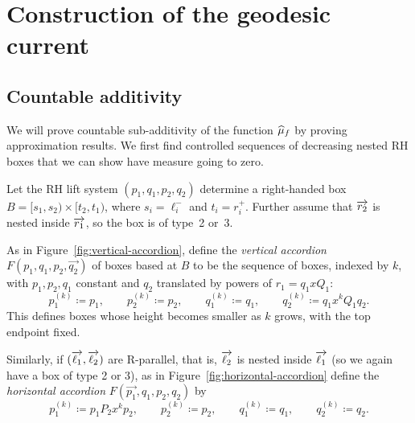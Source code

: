 \section{Construction of the geodesic current}
\label{sec:construct}



\subsection{Countable additivity}
\label{sec:countable-additivity}

We will prove countable sub-additivity of the function $\widehat{\mu}_{f}$ by
proving approximation results. We first find controlled sequences of
decreasing nested RH boxes that we can show have measure going to zero.

\begin{definition}
\label{def:accordion}
Let the RH lift system $(p_1,q_1,p_2,q_2)$ determine a right-handed
box
$B = [s_1,s_2) \times [t_2,t_1)$, where $s_i = \ell_i^-$ and $t_i =
r_i^+$. Further assume that $\overrightarrow{r_2}$ is nested inside $\overrightarrow{r_1}$,
so the box is of type~2 or~3.

As in Figure~\ref{fig:vertical-accordion},
define the \emph{vertical accordion} $F(p_1, q_1, p_2,\vec{q_2})$ of
boxes based at $B$ to be
the sequence of boxes, indexed by $k$, with $p_1, p_2, q_1$ constant
and $q_2$ translated by powers of $r_1 = q_1 x Q_1$:
\[
  p_1^{(k)}\coloneqq p_1,\qquad
  p_2^{(k)}\coloneqq p_2,\qquad
  q_1^{(k)}\coloneqq q_1,\qquad
  q_2^{(k)} \coloneqq q_1 x^k Q_1 q_2.
\]
This defines boxes whose height becomes smaller as $k$
grows, with the top endpoint fixed.

\begin{figure}
\end{figure}

Similarly, if $(\overrightarrow{\ell_1},\overrightarrow{\ell_2})$ are R-parallel, that is, $\overrightarrow{\ell_2}$ is nested inside $\overrightarrow{\ell_1}$ (so we again
have a box of type 2 or 3), as in
Figure~\ref{fig:horizontal-accordion} define the
\emph{horizontal accordion} $F(\vec{p_1},q_1, p_2,q_2)$ by
\[
  p_1^{(k)}\coloneqq p_1 P_2x^k p_2,\qquad
  p_2^{(k)}\coloneqq p_2,\qquad
  q_1^{(k)}\coloneqq q_1,\qquad
  q_2^{(k)} \coloneqq q_2.
\]
\end{definition}


